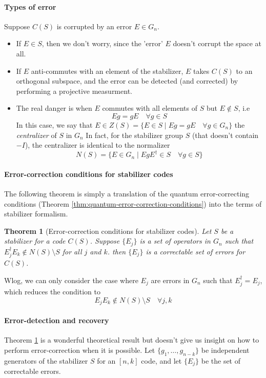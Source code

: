 \documentclass[11pt,a4paper]{article}
\theoremstyle{definition}
\theoremstyle{plain}
\newtheorem{theorem}[definition]{Theorem}
\theoremstyle{remark}
\begin{document}
\paragraph{Types of error} Suppose $C(S)$ is corrupted by an error $E \in G_n$. 
\begin{itemize}
  \item If $E \in S$, then we don't worry, since the 'error' $E$ doesn't corrupt the space at all. 

  \item If $E$ anti-commutes with an element of the stabilizer, 
  $E$ takes $C(S)$ to an orthogonal subspace, and the error can be detected (and corrected) by 
  performing a projective measurment.

  \item The real danger is when $E$ commutes with all elements of $S$ but $E \not\in S$, i.e 
  $$Eg = gE \quad \forall g \in S$$
  In this case, we say that $E \in Z(S) = \{E \in S \mid Eg = gE \quad \forall g \in G_n\}$ the \emph{centralizer} of $S$ in $G_n$ 
  In fact, for the stabilizer group $S$ (that doesn't contain $-I$), the centralizer is identical to the normalizer
  $$N(S) = \{E \in G_n \mid EgE^\dagger \in S \quad \forall g \in S\}$$
\end{itemize} 

\paragraph{Error-correction conditions for stabilizer codes} The following theorem is simply a translation of
the quantum error-correcting conditions (Theorem \ref{thm:quantum-error-correction-conditions}) into the terms 
of stabilizer formalism. 

\begin{theorem}[Error-correction conditions for stabilizer codes]\label{thm:conditions-stabilizer-codes} 
  Let $S$ be a stabilizer for a code $C(S)$. Suppose $\{E_j\}$ is a set of operators in $G_n$ 
  such that $E_j ^\dagger E_k \not \in N(S) \setminus S$ for all $j$ and $k$. then $\{E_j\}$ 
  is a correctable set of errors for $C(S)$.   
\end{theorem}
Wlog, we can only consider the case where $E_j$ are errors in $G_n$ such that $E_j ^\dagger = E_j$, which reduces the condition to 
$$E_j E_k \not\in N(S) \setminus S \quad \forall j, k$$

\paragraph{Error-detection and recovery} Theorem \ref{thm:conditions-stabilizer-codes} is a wonderful theoretical result 
but doesn't give us insight on how to perform error-correction when it is possible. 
Let \(\{g_1,\dots,g_{n-k}\}\) be independent generators of the stabilizer \(S\) for an \([n,k]\) code, and let \(\{E_j\}\) be the set of correctable errors.
\end{document}
